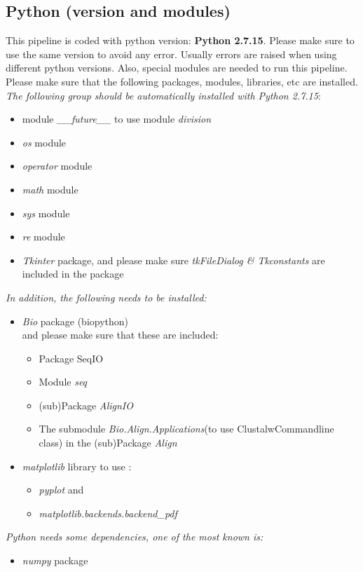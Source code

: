 \documentclass[a4paper,20pt]{report}
\begin{document}
\subsection{Python (version and modules)}
\noindent
This pipeline is coded with python version: \textbf{Python 2.7.15}. Please make sure to use the same version 
to avoid any error. Usually errors are raised when using different python versions. 
Also, special modules are needed to run this pipeline. Please make sure that the following packages, modules, libraries, etc 
are installed.\\
\textasteriskcentered \textit{The following group should be automatically installed with Python 2.7.15}:
\begin{itemize}
  \item    module \textit{\_\_future\_\_} to use module \textit{division}
  \item    \textit{os} module
  \item    \textit{operator} module
  \item    \textit{math} module
  \item    \textit{sys} module
  \item    \textit{re} module
  \item    \textit{Tkinter} package, and please make sure \textit{tkFileDialog \& Tkconstants} are included in the package
\end{itemize}
\noindent  
\textasteriskcentered \textit{In addition, the following needs to be installed:}
\begin{itemize}
  \item    \textit{Bio} package (biopython)\\
  and please make sure that these are included:
  \begin{itemize}
    \item Package SeqIO
    \item Module \textit{seq} 
    \item (sub)Package \textit{AlignIO}
    \item The submodule \textit{Bio.Align.Applications}(to use ClustalwCommandline class) in the (sub)Package \textit{Align}  
  \end{itemize}
  
  \item \textit{matplotlib} library to use :
  \begin{itemize}
    \item \textit{pyplot} and
    \item \textit{matplotlib.backends.backend\_pdf}
  \end{itemize}

\end{itemize}
\textasteriskcentered \textit{Python needs some dependencies, one of the most known is:}
\begin{itemize}
 \item    \textit{numpy} package

\end{itemize}
\end{document}

